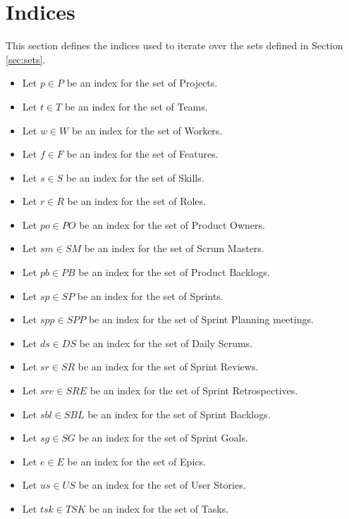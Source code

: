 \documentclass[11pt]{article}
\begin{document}
\section{Indices}
\label{sec:indices}
This section defines the indices used to iterate over the sets defined in Section \ref{sec:sets}.

\begin{itemize}
    \item Let $p \in P$ be an index for the set of Projects.
    \item Let $t \in T$ be an index for the set of Teams.
    \item Let $w \in W$ be an index for the set of Workers.
    \item Let $f \in F$ be an index for the set of Features.
    \item Let $s \in S$ be an index for the set of Skills.
    \item Let $r \in R$ be an index for the set of Roles.
    \item Let $po \in PO$ be an index for the set of Product Owners.
    \item Let $sm \in SM$ be an index for the set of Scrum Masters.
    \item Let $pb \in PB$ be an index for the set of Product Backlogs.
    \item Let $sp \in SP$ be an index for the set of Sprints.
    \item Let $spp \in SPP$ be an index for the set of Sprint Planning meetings.
    \item Let $ds \in DS$ be an index for the set of Daily Scrums.
    \item Let $sr \in SR$ be an index for the set of Sprint Reviews.
    \item Let $sre \in SRE$ be an index for the set of Sprint Retrospectives.
    \item Let $sbl \in SBL$ be an index for the set of Sprint Backlogs.
    \item Let $sg \in SG$ be an index for the set of Sprint Goals.
    \item Let $e \in E$ be an index for the set of Epics.
    \item Let $us \in US$ be an index for the set of User Stories.
    \item Let $tsk \in TSK$ be an index for the set of Tasks.

\end{itemize}
\end{document}
